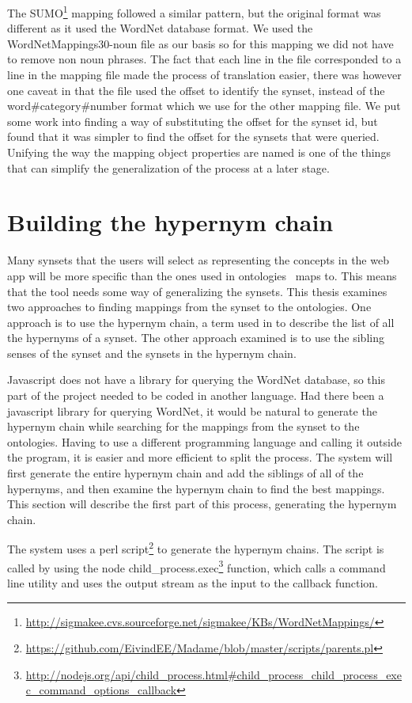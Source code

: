 The SUMO\footnote{\url{http://sigmakee.cvs.sourceforge.net/sigmakee/KBs/WordNetMappings/}} mapping followed a similar pattern,
but the original format was different as it used the WordNet database format.
We used the WordNetMappings30-noun file as our basis so for this mapping we did not have to remove non noun phrases.
The fact that each line in the file corresponded to a line in the mapping file made the process of translation easier,
there was however one caveat in that the file used the offset to identify the synset,
instead of the word\#category\#number format which we use for the other mapping file.
We put some work into finding a way of substituting the offset for the synset id,
but found that it was simpler to find the offset for the synsets that were queried.
Unifying the way the mapping object properties are named is one of the things that can simplify
the generalization of the process at a later stage.



\section{Building the hypernym chain}
\label{BuildingTheHypernymChain}
Many synsets that the users will select as representing the concepts in the web app will be more specific than
the ones used in ontologies \theartefact\ maps to.
This means that the tool needs some way of generalizing the synsets.
This thesis examines two approaches to finding mappings from the synset to the ontologies.
One approach is to use the hypernym chain,
a term used in \citet{Veres2011} to describe the list of all the hypernyms of a synset.
The other approach examined is to use the sibling senses of the synset and the synsets in the hypernym chain.

Javascript does not have a library for 	querying the WordNet database,
so this part of the project needed to be coded in another language.
Had there been a javascript library for querying WordNet,
it would be natural to generate the hypernym chain while searching for the mappings from the synset to the ontologies.
Having to use a different programming language and calling it outside the program,
it is easier and more efficient to split the process.
The system will first generate the entire hypernym chain and add the siblings of all of the hypernyms,
and then examine the hypernym chain to find the best mappings.
This section will describe the first part of this process, generating the hypernym chain.

The system uses a perl script\footnote{\url{https://github.com/EivindEE/Madame/blob/master/scripts/parents.pl}} to generate the hypernym chains.
The script is called by using the node
child\_process.exec\footnote{\url{http://nodejs.org/api/child\_process.html\#child\_process\_child\_process\_exec\_command\_options\_callback}}
function, which calls a command line utility and uses the output stream as the input to the callback function.

